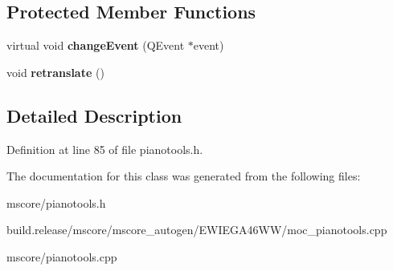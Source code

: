 \subsection*{Protected Member Functions}
\begin{DoxyCompactItemize}
\item 
\mbox{\label{class_ms_1_1_piano_tools_a7d5e57960d322f725c58e4bb948a8fa2}} 
virtual void {\bfseries change\+Event} (Q\+Event $\ast$event)
\item 
\mbox{\label{class_ms_1_1_piano_tools_aa8f3a0717064ecbf2522436e4d18dc28}} 
void {\bfseries retranslate} ()
\end{DoxyCompactItemize}


\subsection{Detailed Description}


Definition at line 85 of file pianotools.\+h.



The documentation for this class was generated from the following files\+:\begin{DoxyCompactItemize}
\item 
mscore/pianotools.\+h\item 
build.\+release/mscore/mscore\+\_\+autogen/\+E\+W\+I\+E\+G\+A46\+W\+W/moc\+\_\+pianotools.\+cpp\item 
mscore/pianotools.\+cpp\end{DoxyCompactItemize}
